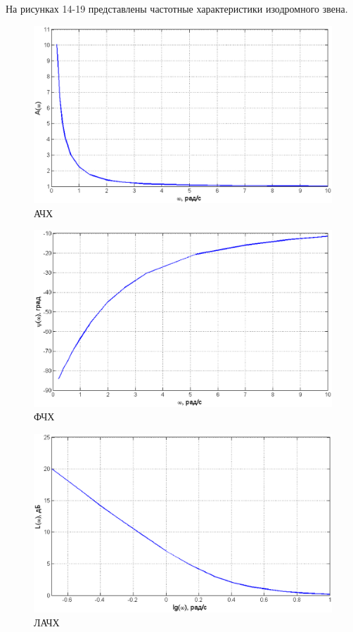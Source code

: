 \documentclass[12pt,a4paper]{article}
\begin{document}
На рисунках 14-19 представлены частотные характеристики изодромного звена.
\begin{figure}[H]
	\centering
	\includegraphics[width=1\linewidth]{ACHH3.eps}
	\caption{АЧХ}
\end{figure}
\begin{figure}[H]
	\centering
	\includegraphics[width=1\linewidth]{FCHH3.eps}
	\caption{ФЧХ}
\end{figure}
\begin{figure}[H]
	\centering
	\includegraphics[width=1\linewidth]{LACHH3.eps}
	\caption{ЛАЧХ}
\end{figure}
\end{document}
